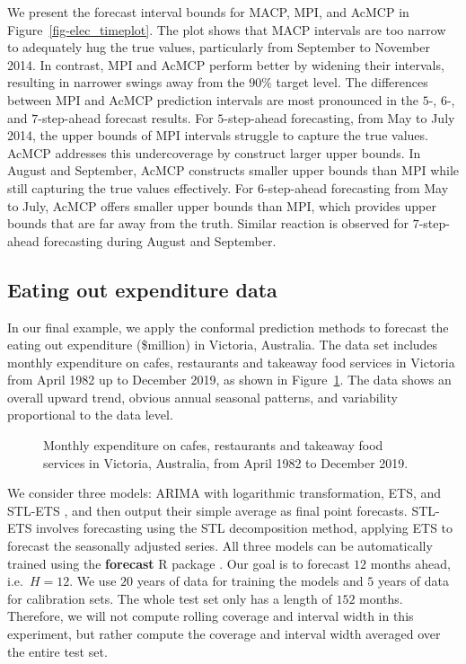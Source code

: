 \documentclass[
  11pt,
  a4paper,
]{article}
\theoremstyle{plain}
\theoremstyle{remark}
\begin{document}
We present the forecast interval bounds for MACP, MPI, and AcMCP in
Figure~\ref{fig-elec_timeplot}. The plot shows that MACP intervals are
too narrow to adequately hug the true values, particularly from
September to November 2014. In contrast, MPI and AcMCP perform better by
widening their intervals, resulting in narrower swings away from the
\(90\%\) target level. The differences between MPI and AcMCP prediction
intervals are most pronounced in the \(5\)-, \(6\)-, and
\(7\)-step-ahead forecast results. For \(5\)-step-ahead forecasting,
from May to July 2014, the upper bounds of MPI intervals struggle to
capture the true values. AcMCP addresses this undercoverage by construct
larger upper bounds. In August and September, AcMCP constructs smaller
upper bounds than MPI while still capturing the true values effectively.
For \(6\)-step-ahead forecasting from May to July, AcMCP offers smaller
upper bounds than MPI, which provides upper bounds that are far away
from the truth. Similar reaction is observed for \(7\)-step-ahead
forecasting during August and September.

\subsection{Eating out expenditure
data}\label{eating-out-expenditure-data}

In our final example, we apply the conformal prediction methods to
forecast the eating out expenditure (\$million) in Victoria, Australia.
The data set includes monthly expenditure on cafes, restaurants and
takeaway food services in Victoria from April 1982 up to December 2019,
as shown in Figure~\ref{fig-cafe_data}. The data shows an overall upward
trend, obvious annual seasonal patterns, and variability proportional to
the data level.

\begin{figure}


\caption{\label{fig-cafe_data}Monthly expenditure on cafes, restaurants
and takeaway food services in Victoria, Australia, from April 1982 to
December 2019.}

\end{figure}%

We consider three models: ARIMA with logarithmic transformation, ETS,
and STL-ETS \autocite{hyndman2021}, and then output their simple average
as final point forecasts. STL-ETS involves forecasting using the STL
decomposition method, applying ETS to forecast the seasonally adjusted
series. All three models can be automatically trained using the
\textbf{forecast} R package \autocite{hyndman2024}. Our goal is to
forecast \(12\) months ahead, i.e.~\(H=12\). We use \(20\) years of data
for training the models and \(5\) years of data for calibration sets.
The whole test set only has a length of \(152\) months. Therefore, we
will not compute rolling coverage and interval width in this experiment,
but rather compute the coverage and interval width averaged over the
entire test set.
\end{document}
